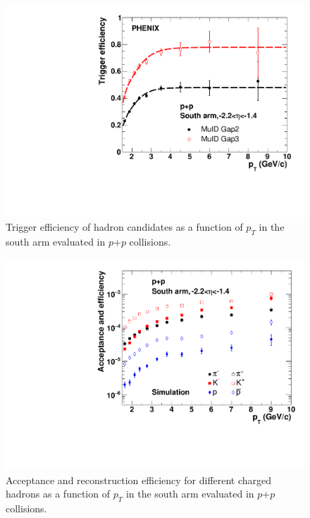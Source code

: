 \documentclass[twocolumn,letterpaper,aps,prc,longbibliography,superscriptaddress,nofootinbib,floatfix]{revtex4-2}
\newcommand{\pt}{\mbox{$p_T$}\xspace}
\newcommand{\pp}{\mbox{$p$+$p$}\xspace}
\begin{document}
\begin{figure}[htb]
\includegraphics[width=1.00\linewidth]{pp_trigeff_pT_arm0.pdf}
\caption{\label{fig:trigeff_pp}
Trigger efficiency of hadron candidates as a function of \pt in the 
south arm evaluated in \pp collisions.}
\end{figure}

\begin{figure}[htb]
\includegraphics[width=1.00\linewidth]{pp_acceff_pid_pT_arm0.pdf}
\caption{\label{fig:acceff_pid_pp}
Acceptance and reconstruction efficiency for different charged hadrons 
as a function of \pt in the south arm evaluated in \pp collisions.}
\end{figure}
\end{document}
